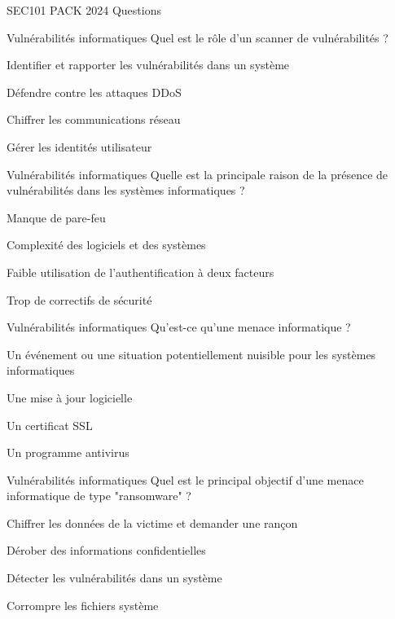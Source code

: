 \documentclass[12pt]{article}
\begin{document}
\begin{quiz}{SEC101 PACK 2024 Questions}
     \begin{multi}[points=1]{Vulnérabilités informatiques}
     Quel est le rôle d'un scanner de vulnérabilités ?
        \item *Identifier et rapporter les vulnérabilités dans un système
        \item Défendre contre les attaques DDoS
        \item Chiffrer les communications réseau
        \item Gérer les identités utilisateur
      \end{multi} 
    
     \begin{multi}[points=1]{Vulnérabilités informatiques}
     Quelle est la principale raison de la présence de vulnérabilités dans les systèmes informatiques ?
        \item Manque de pare-feu
        \item *Complexité des logiciels et des systèmes
        \item Faible utilisation de l'authentification à deux facteurs
        \item Trop de correctifs de sécurité
      \end{multi} 
    
     \begin{multi}[points=1]{Vulnérabilités informatiques}
     Qu'est-ce qu'une menace informatique ?
        \item *Un événement ou une situation potentiellement nuisible pour les systèmes informatiques
        \item Une mise à jour logicielle
        \item Un certificat SSL
        \item Un programme antivirus
      \end{multi} 
    
     \begin{multi}[points=1]{Vulnérabilités informatiques}
     Quel est le principal objectif d'une menace informatique de type "ransomware" ?
        \item *Chiffrer les données de la victime et demander une rançon
        \item Dérober des informations confidentielles
        \item Détecter les vulnérabilités dans un système
        \item Corrompre les fichiers système
      \end{multi} 
    

\end{quiz}
\end{document}
